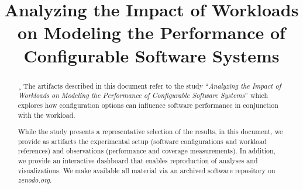 \documentclass[10pt,conference]{IEEEtran}
\begin{document}
	
\title{Analyzing the Impact of Workloads on Modeling the Performance of Configurable Software Systems}

\author{
	\centering
	\and
	\and
	\and
	\and
	\linebreakand
	\and
}

	
	
	\maketitle
	
	
	\maketitle
	\setcounter{tocdepth}{4}
	
	\begin{abstract}¸
	The artifacts described in this document refer to the study ``\textit{Analyzing the Impact of Workloads on Modeling the Performance of Configurable Software Systems}'' which explores how configuration options can influence software performance in conjunction with the workload.
	
	While the study presents a representative selection of the results, in this document, we provide as artifacts the experimental setup (software configurations and workload references) and observations (performance and coverage measurements). In addition, we provide an interactive dashboard that enables reproduction of analyses and visualizations. We make available all material via an archived software repository on \textit{zenodo.org}.
	\end{abstract}
\end{document}
